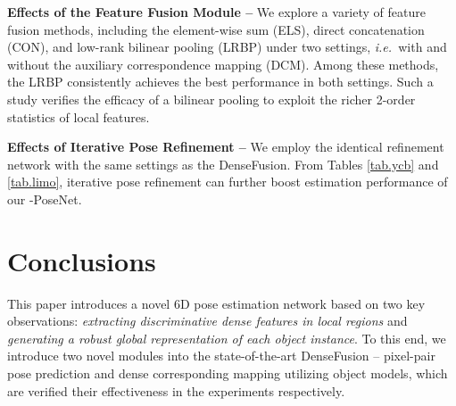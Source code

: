 \documentclass[letterpaper, 10 pt, conference]{ieeeconf}
\def\ie{\emph{i.e.~}} \def\Ie{\emph{I.e.}~}
\begin{document}
\vspace{0.1cm}\noindent\textbf{Effects of the Feature Fusion Module --}
{We explore a variety of feature fusion methods, including the element-wise sum (ELS), direct concatenation (CON), and low-rank bilinear pooling (LRBP) under two settings, \ie with and without the auxiliary correspondence mapping (DCM).
Among these methods, the LRBP consistently achieves the best performance in both settings.
Such a study verifies the efficacy of a bilinear pooling to exploit the richer 2-order statistics of local features.}



\vspace{0.1cm}\noindent\textbf{Effects of Iterative Pose Refinement --}
We employ the identical refinement network with the same settings as the DenseFusion.
From Tables \ref{tab.ycb} and \ref{tab.limo}, iterative pose refinement can further boost estimation performance of our -PoseNet. 








\section{Conclusions}

This paper introduces a novel 6D pose estimation network based on two key observations: \textit{extracting discriminative dense features in local regions} and \textit{generating a robust global representation of each object instance}. 
To this end, we introduce two novel modules into the state-of-the-art DenseFusion -- pixel-pair pose prediction and dense corresponding mapping utilizing object models, which are verified their effectiveness in the experiments respectively.




\end{document}
